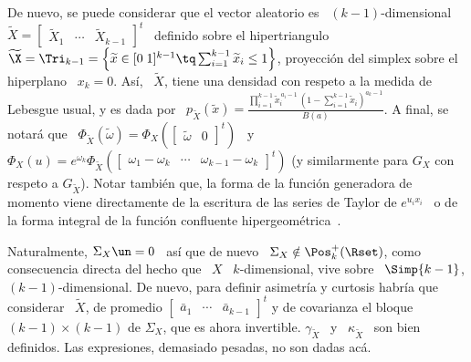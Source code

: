 
De nuevo, se puede considerar que el vector aleatorio es \ $(k-1)$-dimensional \
$\widetilde{X}     =    \begin{bmatrix}     \widetilde{X}_1    &     \cdots    &
  \widetilde{X}_{k-1}  \end{bmatrix}^t$  \ definido  sobre  el hipertriangulo  \
$\widetilde{\X}  = \Tri_{k-1}  = \left\{  \widetilde{x} \in  [0 \;  1]^{k-1} \tq
  \sum_{i=1}^{k-1}  \widetilde{x}_i \le  1 \right\}$,  proyecci\'on  del simplex
sobre el  hiperplano \ $x_k =  0$. As\'i, \ $\widetilde{X}$,  tiene una densidad
con   respeto   a   la  medida   de   Lebesgue   usual,   y   es  dada   por   \
$p_{\widetilde{X}}\left(   \widetilde{x}   \right)   =   \frac{\prod_{i=1}^{k-1}
  \widetilde{x}_i^{\,  a_i-1}  \, \left(  1  - \sum_{i=1}^{k-1}  \widetilde{x}_i
  \right)^{a_k-1}}{B(a)}$.      A      final,     se     notar\'a      que     \
$\Phi_{\widetilde{X}}\left(         \widetilde{\omega}         \right)         =
\Phi_X\left( \begin{bmatrix} \widetilde{\omega} & 0 \end{bmatrix}^t \right)$ \ y
\ $\Phi_X(u) =  e^{\omega_k} \Phi_{\widetilde{X}}\left( \begin{bmatrix} \omega_1
    - \omega_k  & \cdots &  \omega_{k-1} - \omega_k \end{bmatrix}^t  \right)$ (y
similarmente  para $G_X$  con respeto  a $G_{\widetilde{X}}$).   Notar tambi\'en
que, la  forma de la  funci\'on generadora de  momento viene directamente  de la
escritura de las series  de Taylor de $e^{u_i x_i}$ \ o  de la forma integral de
la funci\'on confluente hipergeom\'etrica~\cite{Phi88}.

Naturalmente,  $\Sigma_X \un  = 0$  \  as\'i que  de nuevo  \ $\Sigma_X  \notin
\Pos_k^+(\Rset)$, como consecuencia directa del  hecho que \ $X$ \ $k$-dimensional,
vive  sobre   \  $\Simp{k-1}$,  $(k-1)$-dimensional.  De   nuevo,  para  definir
asimetr\'ia y  curtosis habr\'ia que  considerar \ $\widetilde{X}$,  de promedio
$\begin{bmatrix}  \bar{a}_1  &  \cdots  & \bar{a}_{k-1}  \end{bmatrix}^t$  y  de
covarianza  el  bloque  $(k-1)  \times   (k-1)$  de  $\Sigma_X$,  que  es  ahora
invertible. $\gamma_{\widetilde{X}}$  \ y \ $\kappa_{\widetilde{X}}$  \ son bien
definidos. Las expresiones, demasiado pesadas, no son dadas ac\'a.

